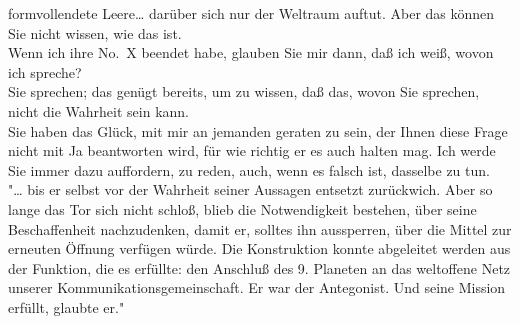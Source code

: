 \documentclass[
]{article}
\begin{document}
formvollendete Leere\ldots{} darüber sich nur der Weltraum auftut. Aber
das können Sie nicht wissen, wie das ist.\\
Wenn ich ihre No.~X beendet habe, glauben Sie mir dann, daß ich weiß,
wovon ich spreche?\\
Sie sprechen; das genügt bereits, um zu wissen, daß das, wovon Sie
sprechen, nicht die Wahrheit sein kann.\\
Sie haben das Glück, mit mir an jemanden geraten zu sein, der Ihnen
diese Frage nicht mit Ja beantworten wird, für wie richtig er es auch
halten mag. Ich werde Sie immer dazu auffordern, zu reden, auch, wenn es
falsch ist, dasselbe zu tun.\\
"\ldots{} bis er selbst vor der Wahrheit seiner Aussagen entsetzt
zurückwich. Aber so lange das Tor sich nicht schloß, blieb die
Notwendigkeit bestehen, über seine Beschaffenheit nachzudenken, damit
er, solltes ihn aussperren, über die Mittel zur erneuten Öffnung
verfügen würde. Die Konstruktion konnte abgeleitet werden aus der
Funktion, die es erfüllte: den Anschluß des 9. Planeten an das
weltoffene Netz unserer Kommunikationsgemeinschaft. Er war der
Antegonist. Und seine Mission erfüllt, glaubte er."
\end{document}

